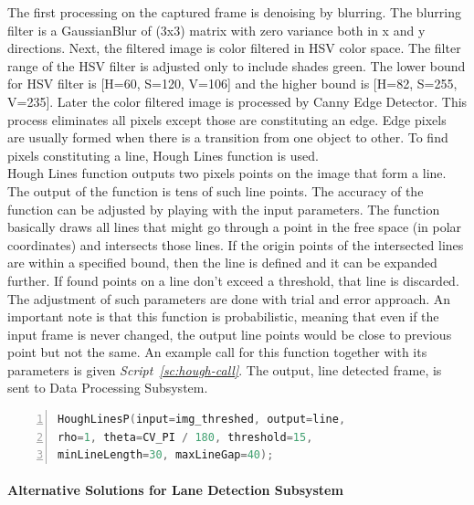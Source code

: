 \documentclass[a4paper,12pt]{article}
\begin{document}
	The first processing on the captured frame is denoising by blurring. The blurring filter is a GaussianBlur of (3x3) matrix with zero variance both in x and y directions. Next, the filtered image is color filtered in HSV color space. The filter range of the HSV filter is adjusted only to include shades green. The lower bound for HSV filter is [H=60, S=120, V=106] and the higher bound is [H=82, S=255, V=235]. Later the color filtered image is processed by Canny Edge Detector. This process eliminates all pixels except those are constituting an edge. Edge pixels are usually formed when there is a transition from one object to other. To find pixels constituting a line, Hough Lines function is used.\\
	
	Hough Lines function outputs two pixels points on the image that form a line. The output of the function is tens of such line points. The accuracy of the function can be adjusted by playing with the input parameters. The function basically draws all lines that might go through a point in the free space (in polar coordinates) and intersects those lines. If the origin points of the intersected lines are within a specified bound, then the line is defined and it can be expanded further. If found points on a line don't exceed a threshold, that line is discarded. The adjustment of such parameters are done with trial and error approach. An important note is that this function is probabilistic, meaning that even if the input frame is never changed, the output line points would be close to previous point but not the same. An example call for this function together with its parameters is given \textit{Script~\ref{sc:hough-call}}. The output, line detected frame, is sent to Data Processing Subsystem.
		\begin{lstlisting}[language=C++,float=h,numbers=left,frame=single,caption=Hough Lines Function with its Parameters, captionpos=b, label=sc:hough-call]
HoughLinesP(input=img_threshed, output=line,
rho=1, theta=CV_PI / 180, threshold=15, 
minLineLength=30, maxLineGap=40);
	\end{lstlisting}
	
	\paragraph{Alternative Solutions for Lane Detection Subsystem}
	
\end{document}
